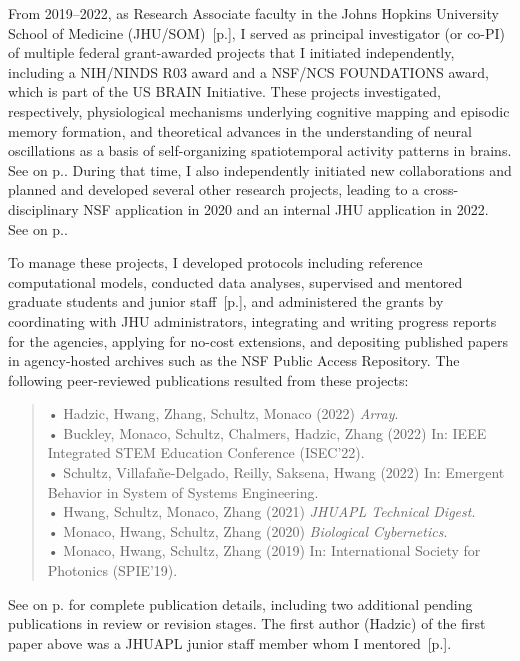 \documentclass[10pt]{article}
\newcommand{\see}[1]{[\textcolor{hopkinsblue}{p.\pageref{sec:#1}}]}
\newcommand{\cf}[1]{\textcolor{hopkinsblue}{See \emph{\nameref{sec:#1}} on p.\pageref{sec:#1}}}
\begin{document}

From 2019--2022, as Research Associate faculty in the Johns Hopkins University
School of Medicine (JHU/SOM)~\see{job1}, I served as principal investigator
(or co-PI) of multiple federal grant-awarded projects that I initiated
independently, including a NIH/NINDS R03 award and a NSF/NCS FOUNDATIONS
award, which is part of the US BRAIN Initiative. These projects investigated,
respectively, physiological mechanisms underlying cognitive mapping and episodic
memory formation, and theoretical advances in the understanding of neural
oscillations as a basis of self-organizing spatiotemporal activity patterns
in brains. \cf{funding}. During that time, I also independently initiated new
collaborations and planned and developed several other research projects,
leading to a cross-disciplinary NSF application in 2020 and an internal JHU
application in 2022. \cf{resprogram}.

To manage these projects, I developed protocols including reference
computational models, conducted data analyses, supervised and mentored graduate
students and junior staff~\see{mentoring}, and administered the grants by
coordinating with JHU administrators, integrating and writing progress reports
for the agencies, applying for no-cost extensions, and depositing published
papers in agency-hosted archives such as the NSF Public Access Repository. The
following peer-reviewed publications resulted from these projects:
%
\begin{quote}
  • Hadzic, Hwang, Zhang, Schultz, Monaco (2022) \emph{Array}. \\
  • Buckley, Monaco, Schultz, Chalmers, Hadzic, Zhang (2022) In: IEEE
  Integrated STEM Education Conference (ISEC'22). \\
  • Schultz, Villafañe-Delgado, Reilly, Saksena, Hwang (2022) In: Emergent
  Behavior in System of Systems Engineering. \\
  • Hwang, Schultz, Monaco, Zhang (2021) \emph{JHUAPL Technical Digest}. \\ 
  • Monaco, Hwang, Schultz, Zhang (2020) \emph{Biological Cybernetics}. \\ 
  • Monaco, Hwang, Schultz, Zhang (2019) In: International Society for
  Photonics (SPIE'19). \\
\end{quote}
%
\cf{pubs} for complete publication details, including two additional
pending publications in review or revision stages. The first author
(Hadzic) of the first paper above was a JHUAPL junior staff member whom I
mentored~\see{mentoring}.
\end{document}

